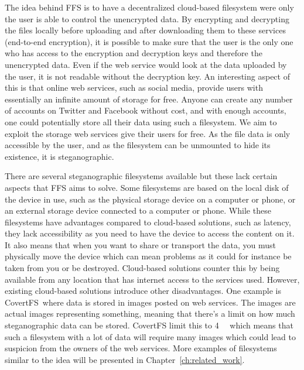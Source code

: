 The idea behind FFS is to have a decentralized cloud-based filesystem were only the user is able to control the unencrypted data. By encrypting and decrypting the files locally before uploading and after downloading them to these services (end-to-end encryption), it is possible to make sure that the user is the only one who has access to the encryption and decryption keys and therefore the unencrypted data. Even if the web service would look at the data uploaded by the user, it is not readable without the decryption key. An interesting aspect of this is that online web services, such as social media, provide users with essentially an infinite amount of storage for free. Anyone can create any number of accounts on Twitter and Facebook without cost, and with enough accounts, one could potentially store all their data using such a filesystem. We aim to exploit the storage web services give their users for free. As the file data is only accessible by the user, and as the filesystem can be unmounted to hide its existence, it is steganographic. 

There are several steganographic filesystems available but these lack certain aspects that FFS aims to solve. Some filesystems are based on the local disk of the device in use, such as the physical storage device on a computer or phone, or an external storage device connected to a computer or phone. While these filesystems have advantages compared to cloud-based solutions, such as latency, they lack accessibility as you need to have the device to access the content on it. It also means that when you want to share or transport the data, you must physically move the device which can mean problems as it could for instance be taken from you or be destroyed. Cloud-based solutions counter this by being available from any location that has internet access to the services used. However, existing cloud-based solutions introduce other disadvantages. One example is CovertFS\,\cite{baliga2007web} where data is stored in images posted on web services. The images are actual images representing something, meaning that there's a limit on how much steganographic data can be stored. CovertFS limit this to \SI{4}{\kilo\byte} which means that such a filesystem with a lot of data will require many images which could lead to suspicion from the owners of the web services. More examples of filesystems similar to the idea will be presented in Chapter~\ref{ch:related_work}. 